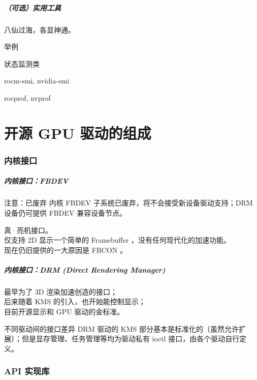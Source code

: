 \documentclass{ctexbeamer}
\begin{document}
\begin{frame}
    \frametitle{（可选）实用工具}
    八仙过海，各显神通。
    \begin{block}{举例}
        \begin{labeling}{状态监测类}
            \item [状态监测类] rocm-smi, nvidia-smi
            \item [性能分析类] rocprof, nvprof
        \end{labeling}
    \end{block}
\end{frame}

\part{开源 GPU 驱动的组成}
\frame{\partpage}

\section{内核接口}

\begin{frame}
    \frametitle{内核接口：FBDEV}
    \begin{alertblock}{注意：已废弃}
        内核 FBDEV 子系统已废弃，将不会接受新设备驱动支持；DRM 设备仍可提供 FBDEV 兼容设备节点。
    \end{alertblock}
    真·亮机接口。\\
    仅支持 2D 显示一个简单的 Framebuffer ，没有任何现代化的加速功能。\\
    现在仍旧提供的一大原因是 FBCON 。
\end{frame}

\begin{frame}
    \frametitle{内核接口：DRM (Direct Rendering Manager)}
    最早为了 3D 渲染加速创造的接口；\\
    后来随着 KMS 的引入，也开始能控制显示；\\
    目前开源显示和 GPU 驱动的金标准。\\
    \begin{block}{不同驱动间的接口差异}
        DRM 驱动的 KMS 部分基本是标准化的（虽然允许扩展）；但是显存管理、任务管理等均为驱动私有 ioctl 接口，由各个驱动自行定义。
    \end{block}
\end{frame}

\section{API 实现库}
\end{document}
